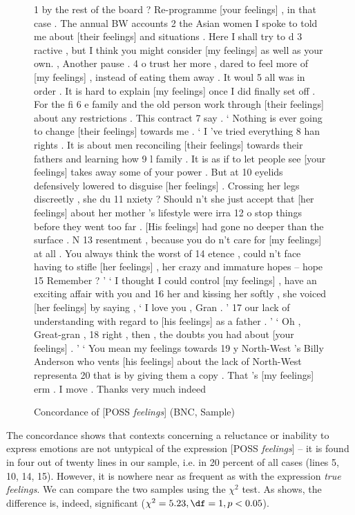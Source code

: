 \begin{figure}
\caption{Concordance of [POSS \textit{feelings}] (BNC, Sample)}
\label{fig:possfeelings}
\hrulefill
\begin{fitverb}
 1  by the rest of the board ? Re-programme [your feelings] , in that case . The annual BW accounts
 2 the Asian women I spoke to told me about [their feelings] and situations . Here I shall try to d
 3 ractive , but I think you might consider [my feelings] as well as your own. , Another pause .
 4 o trust her more , dared to feel more of [my feelings] , instead of eating them away . It woul
 5 all was in order . It is hard to explain [my feelings] once I did finally set off . For the fi
 6 e family and the old person work through [their feelings] about any restrictions . This contract
 7  say . ` Nothing is ever going to change [their feelings] towards me . ` I 've tried everything
 8 han rights . It is about men reconciling [their feelings] towards their fathers and learning how
 9 l family . It is as if to let people see [your feelings] takes away some of your power . But at
10  eyelids defensively lowered to disguise [her feelings] . Crossing her legs discreetly , she du
11 nxiety ? Should n't she just accept that [her feelings] about her mother 's lifestyle were irra
12 o stop things before they went too far . [His feelings] had gone no deeper than the surface . N
13 resentment , because you do n't care for [my feelings] at all . You always think the worst of
14 etence , could n't face having to stifle [her feelings] , her crazy and immature hopes -- hope
15 Remember ? ' ` I thought I could control [my feelings] , have an exciting affair with you and
16  her and kissing her softly , she voiced [her feelings] by saying , ` I love you , Gran . '
17 our lack of understanding with regard to [his feelings] as a father . ' ` Oh , Great-gran ,
18  right , then , the doubts you had about [your feelings] . ' ` You mean my feelings towards
19 y North-West 's Billy Anderson who vents [his feelings] about the lack of North-West representa
20  that is by giving them a copy . That 's [my feelings] erm . I move . Thanks very much indeed
\end{fitverb}
\hrulefill
\end{figure}

The concordance  shows that contexts concerning a reluctance or inability to express emotions  are not untypical of the expression [POSS \textit{feelings}] -- it is found in four out of twenty lines in our sample, i.e. in 20 percent of all cases (lines 5, 10, 14, 15). However, it is nowhere near as frequent as with the expression \textit{true feelings}. We can compare the two samples using the $\chi^2$  test. As  shows, the difference is, indeed, significant ($\chi^2 = 5.23, \df = 1, p < 0.05$).


